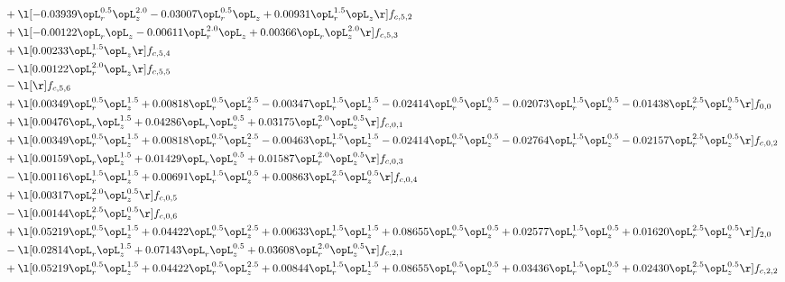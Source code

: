 \begin{alignat}{2}
& + \l[  -0.03939 \opL_r^{0.5} \opL_z^{2.0}   -0.03007 \opL_r^{0.5} \opL_z +  0.00931 \opL_r^{1.5} \opL_z  \r] f_{c,5,2} \nonumber \\ 
& + \l[  -0.00122 \opL_r \opL_z   -0.00611 \opL_r^{2.0} \opL_z +  0.00366 \opL_r \opL_z^{2.0}  \r] f_{c,5,3} \nonumber \\ 
& + \l[  0.00233 \opL_r^{1.5} \opL_z  \r] f_{c,5,4} \nonumber \\ 
& - \l[  0.00122 \opL_r^{2.0} \opL_z  \r] f_{c,5,5} \nonumber \\ 
& - \l[  \r] f_{c,5,6} \nonumber \\ 
& + \l[  0.00349 \opL_r^{0.5} \opL_z^{1.5} +  0.00818 \opL_r^{0.5} \opL_z^{2.5}   -0.00347 \opL_r^{1.5} \opL_z^{1.5}   -0.02414 \opL_r^{0.5} \opL_z^{0.5}   -0.02073 \opL_r^{1.5} \opL_z^{0.5}   -0.01438 \opL_r^{2.5} \opL_z^{0.5}  \r] f_{0,0} \nonumber \\ 
& + \l[  0.00476 \opL_r \opL_z^{1.5} +  0.04286 \opL_r \opL_z^{0.5} +  0.03175 \opL_r^{2.0} \opL_z^{0.5}  \r] f_{c,0,1} \nonumber \\ 
& + \l[  0.00349 \opL_r^{0.5} \opL_z^{1.5} +  0.00818 \opL_r^{0.5} \opL_z^{2.5}   -0.00463 \opL_r^{1.5} \opL_z^{1.5}   -0.02414 \opL_r^{0.5} \opL_z^{0.5}   -0.02764 \opL_r^{1.5} \opL_z^{0.5}   -0.02157 \opL_r^{2.5} \opL_z^{0.5}  \r] f_{c,0,2} \nonumber \\ 
& + \l[  0.00159 \opL_r \opL_z^{1.5} +  0.01429 \opL_r \opL_z^{0.5} +  0.01587 \opL_r^{2.0} \opL_z^{0.5}  \r] f_{c,0,3} \nonumber \\ 
& - \l[  0.00116 \opL_r^{1.5} \opL_z^{1.5} +  0.00691 \opL_r^{1.5} \opL_z^{0.5} +  0.00863 \opL_r^{2.5} \opL_z^{0.5}  \r] f_{c,0,4} \nonumber \\ 
& + \l[  0.00317 \opL_r^{2.0} \opL_z^{0.5}  \r] f_{c,0,5} \nonumber \\ 
& - \l[  0.00144 \opL_r^{2.5} \opL_z^{0.5}  \r] f_{c,0,6} \nonumber \\ 
& + \l[  0.05219 \opL_r^{0.5} \opL_z^{1.5} +  0.04422 \opL_r^{0.5} \opL_z^{2.5} +  0.00633 \opL_r^{1.5} \opL_z^{1.5} +  0.08655 \opL_r^{0.5} \opL_z^{0.5} +  0.02577 \opL_r^{1.5} \opL_z^{0.5} +  0.01620 \opL_r^{2.5} \opL_z^{0.5}  \r] f_{2,0} \nonumber \\ 
& - \l[  0.02814 \opL_r \opL_z^{1.5} +  0.07143 \opL_r \opL_z^{0.5} +  0.03608 \opL_r^{2.0} \opL_z^{0.5}  \r] f_{c,2,1} \nonumber \\ 
& + \l[  0.05219 \opL_r^{0.5} \opL_z^{1.5} +  0.04422 \opL_r^{0.5} \opL_z^{2.5} +  0.00844 \opL_r^{1.5} \opL_z^{1.5} +  0.08655 \opL_r^{0.5} \opL_z^{0.5} +  0.03436 \opL_r^{1.5} \opL_z^{0.5} +  0.02430 \opL_r^{2.5} \opL_z^{0.5}  \r] f_{c,2,2} \nonumber \\ 

\end{alignat}
